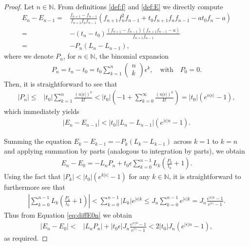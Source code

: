 \documentclass[reqno,a4paper]{amsart}
\numberwithin{equation}{section}
\theoremstyle{plain}
\theoremstyle{remark}
\begin{document}
\begin{proof}
    Let $n\in\mathbb{N}$. From definitions \ref{def:f} and \ref{def:E} we directly compute
    \begin{align}\label{eq:EdiffFirst}
        \nonumber E_n-E_{n-1}=&\frac{f_{n+1}-f_{n-1}}{f_{n+1}f_nf_{n-1}}\left(f_{n+1}f_n^2f_{n-1}+t_0f_{n+1}f_nf_{n-1}-at_0f_n-a\right)\\
        =&-(t_n-t_0)\frac{\left(f_{n+1}-f_{n-1}\right)\left(f_{n+1}f_{n-1}-a\right)}{f_{n+1}f_{n-1}}\nonumber\\
        =&-P_n(L_n-L_{n-1}),
    \end{align}
    where we denote $P_n$, for $n\in\mathbb{N}$, the binomial expansion
    \begin{align*}
        P_n=t_n-t_0=t_0\sum_{k=1}^{n}\begin{pmatrix}n\\k\end{pmatrix}\epsilon^k,\quad\text{with}\quad P_0=0.
    \end{align*}
    Then, it is straightforward to see that
    \begin{align*}
        \left|P_n\right|\leq&\left|t_0\right|\sum_{k=1}^{n}\frac{\left(n\left|\epsilon\right|\right)^k}{k!}<\left|t_0\right|\left(-1+\sum_{k=0}^{\infty}\frac{\left(n\left|\epsilon\right|\right)^k}{k!}\right)=\left|t_0\right|\left(e^{n|\epsilon|}-1\right),
    \end{align*}
    which immediately yields
    \begin{align}\label{ineq:Ediff}
        \left|E_n-E_{n-1}\right|<\left|t_0\right|\left|L_n-L_{n-1}\right|\left(e^{|\epsilon|n}-1\right).
    \end{align}
    
    Summing the equation $E_k-E_{k-1}=-P_k(L_k-L_{k-1})$ across $k=1$ to $k=n$ and applying summation by parts (analogous to integration by parts), we obtain
    \begin{align}\label{eq:diffE0n}
        E_n-E_0=-L_nP_n+t_0\epsilon\sum_{k=0}^{n-1}L_k\left(\frac{P_k}{t_0}+1\right).
    \end{align}
    Using the fact that $|P_k|<|t_0|(e^{k|\epsilon|}-1)$ for any $k\in\mathbb{N}$, it is straightforward to furthermore see that
    \begin{align*}
        \left|\sum_{k=0}^{n-1}L_k\left(\frac{P_k}{t_0}+1\right)\right|<\sum_{k=0}^{n-1}\left|L_k\right|e^{|\epsilon|k}\leq J_n\sum_{k=0}^{n-1}e^{|\epsilon|k}=J_n\frac{e^{|\epsilon|n}-1}{e^{|\epsilon|}-1}.
    \end{align*}
    Thus from Equation \eqref{eq:diffE0n} we obtain
    \begin{align*}
        |E_n-E_0|<&|L_nP_n|+|t_0\epsilon|J_n\frac{e^{|\epsilon|n}-1}{e^{|\epsilon|}-1}<2\left|t_0\right|J_n\left(e^{|\epsilon|n}-1\right),
    \end{align*}
    as required.
\end{proof}
\end{document}
